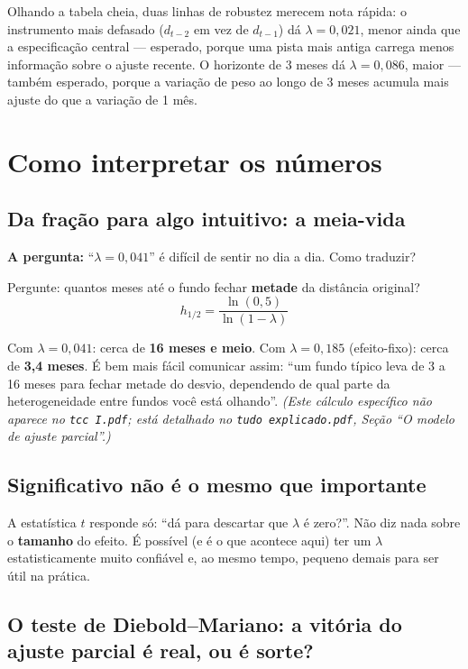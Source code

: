 \documentclass[11pt,a4paper]{article}
\newcommand{\pergunta}[1]{\par\vspace{4pt}\noindent\textbf{\color{azul}A pergunta:} #1\par\vspace{2pt}}
\begin{document}
Olhando a tabela cheia, duas linhas de robustez merecem nota rápida: o instrumento mais defasado
($d_{t-2}$ em vez de $d_{t-1}$) dá $\lambda=0{,}021$, menor ainda que a especificação central ---
esperado, porque uma pista mais antiga carrega menos informação sobre o ajuste recente. O
horizonte de 3 meses dá $\lambda=0{,}086$, maior --- também esperado, porque a variação de peso
ao longo de 3 meses acumula mais ajuste do que a variação de 1 mês.

\section{Como interpretar os números}

\subsection{Da fração para algo intuitivo: a meia-vida}

\pergunta{``$\lambda=0{,}041$'' é difícil de sentir no dia a dia. Como traduzir?}

Pergunte: quantos meses até o fundo fechar \textbf{metade} da distância original?
$$h_{1/2} = \frac{\ln(0{,}5)}{\ln(1-\lambda)}$$

Com $\lambda=0{,}041$: cerca de \textbf{16 meses e meio}. Com $\lambda=0{,}185$ (efeito-fixo):
cerca de \textbf{3,4 meses}. É bem mais fácil comunicar assim: ``um fundo típico leva de 3 a 16
meses para fechar metade do desvio, dependendo de qual parte da heterogeneidade entre fundos
você está olhando''. \emph{(Este cálculo específico não aparece no \texttt{tcc I.pdf}; está
detalhado no \texttt{tudo explicado.pdf}, Seção ``O modelo de ajuste parcial''.)}

\subsection{Significativo não é o mesmo que importante}

A estatística $t$ responde só: ``dá para descartar que $\lambda$ é zero?''. Não diz nada sobre
o \textbf{tamanho} do efeito. É possível (e é o que acontece aqui) ter um $\lambda$
estatisticamente muito confiável e, ao mesmo tempo, pequeno demais para ser útil na prática.

\subsection{O teste de Diebold--Mariano: a vitória do ajuste parcial é real, ou é sorte?}
\label{sec:dm}
\end{document}
